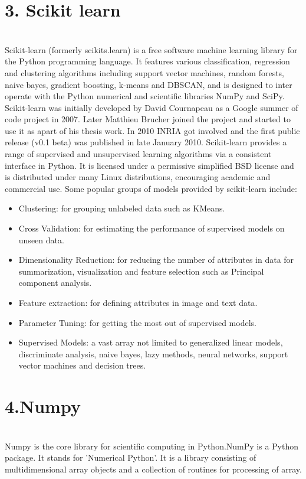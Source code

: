 \chapter{\textbf{3. Scikit learn }}\\
Scikit-learn (formerly scikits.learn) is a free software machine learning library for the Python programming language. It features various classification, regression and clustering algorithms including support vector machines, random forests, naive bayes, gradient boosting, k-means and DBSCAN, and is designed to inter operate with the Python numerical and scientific libraries NumPy and SciPy. Scikit-learn was initially developed by David Cournapeau as a Google summer of code project in 2007. Later Matthieu Brucher joined the project and started to use it as apart of his thesis work. In 2010 INRIA got involved and the first public release (v0.1 beta) was published in late January 2010. Scikit-learn provides a range of supervised and unsupervised learning algorithms via a consistent interface in Python. It is licensed under a permissive simplified BSD license and is distributed under many Linux distributions, encouraging academic and commercial use. 
Some popular groups of models provided by scikit-learn include: 
\begin{itemize}
	\item Clustering: for grouping unlabeled data such as KMeans.
	\item Cross Validation: for estimating the performance of supervised 	models on unseen data.
	\item Dimensionality Reduction: for reducing the number of attributes in data for summarization, visualization and feature selection such as Principal component analysis. 
	\item Feature extraction: for defining attributes in image and text data. 
	\item Parameter Tuning: for getting the most out of supervised models. 
	\item Supervised Models: a vast array not limited to generalized linear models, discriminate analysis, naive bayes, lazy methods, neural networks, support vector machines and decision trees. 
\end{itemize}

\chapter{\textbf{4.Numpy }}\\
Numpy is  the core library for scientific computing in Python.NumPy is a Python package. It stands for 'Numerical Python'. It is a library consisting of multidimensional array objects and a collection of routines for processing of array.\\


